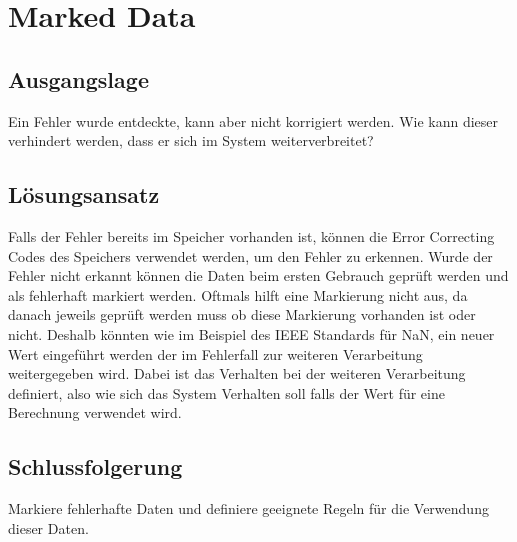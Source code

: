 \section{Marked Data}

\subsection{Ausgangslage}

Ein Fehler wurde entdeckte, kann aber nicht korrigiert werden. Wie kann dieser verhindert werden, dass er sich im System weiterverbreitet?

\subsection{Lösungsansatz}

Falls der Fehler bereits im Speicher vorhanden ist, können die Error Correcting Codes des Speichers verwendet werden, um den Fehler zu erkennen. Wurde der Fehler nicht erkannt können die Daten beim ersten Gebrauch geprüft werden und als fehlerhaft markiert werden. Oftmals hilft eine Markierung nicht aus, da danach jeweils geprüft werden muss ob diese Markierung vorhanden ist oder nicht. Deshalb könnten wie im Beispiel des IEEE Standards für NaN, ein neuer Wert eingeführt werden der im Fehlerfall zur weiteren Verarbeitung weitergegeben wird. Dabei ist das Verhalten bei der weiteren Verarbeitung definiert, also wie sich das System Verhalten soll falls der Wert für eine Berechnung verwendet wird.

\subsection{Schlussfolgerung}

Markiere fehlerhafte Daten und definiere geeignete Regeln für die Verwendung dieser Daten.

